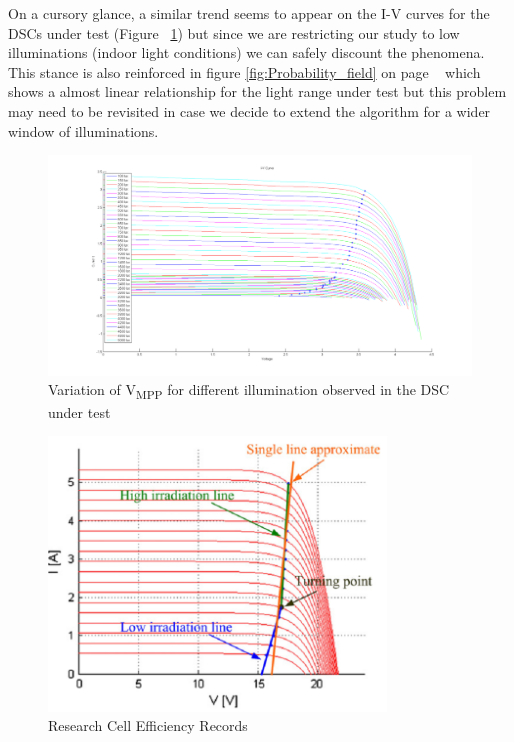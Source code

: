 On a cursory glance, a similar trend seems to appear on the I-V curves for the \ac{DSCs} under test (Figure ~\ref{fig:vmmp_lux50_5000}) but since we are restricting our study to low illuminations (indoor light conditions) we can safely discount the phenomena. This stance is also reinforced in figure \ref{fig:Probability_field} on page ~\pageref{fig:Probability_field} which shows a almost linear relationship for the light range under test but this problem may need to be revisited in case we decide to extend the algorithm for a wider window of illuminations.        
   
    \begin{figure}[H]
     \begin{center}
     \includegraphics[width=\textwidth]{images/IV_50-500}
     \caption{Variation of V\textsubscript{MPP} for different illumination observed in the DSC under test }
     \label{fig:vmmp_lux50_5000}
     \end{center}
     \end{figure}
   
 
  \begin{figure}[H]
   \begin{center}
   \includegraphics[width=0.8\textwidth]{images/IVCurve_lui_2}
   \caption{Research Cell Efficiency Records \cite{liu2011fast} }
   \label{fig:Lui_IV_2}
   \end{center}
   \end{figure}

